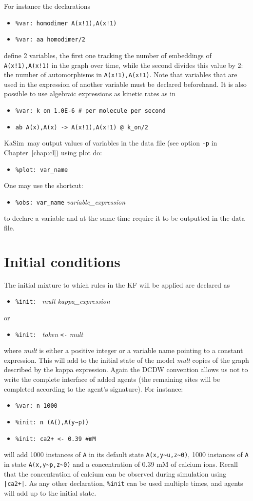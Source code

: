 \documentclass[11pt]{book}
\def\KaSim{\textsf{KaSim}}
\def\int{\hbox{\texttt{\~}}}
\def\ttt#1{\texttt{#1}}
\def\var#1{\textquotesingle #1\textquotesingle}
\def\noi{\noindent}
\def\ITE#1{\begin{itemize}#1\end{itemize}}
\begin{document}

\noi For instance the declarations
\ITE{
\item[] \ttt{\%var: \var{homodimer}~A(x!1),A(x!1)}
\item[] \ttt{\%var: \var{aa}~\var{homodimer}/2}
}
define 2 variables, the first one tracking the number of embeddings of \ttt{A(x!1),A(x!1)} in the graph over time, while the second divides this value by 2: the number of automorphisms in \ttt{A(x!1),A(x!1)}. Note that variables that are used in the expression of another variable must be declared beforehand. 
\vskip 0.25cm
\noi It is also possible to use algebraic expressions as kinetic rates as in
\ITE{
\item[] \ttt{\%var: \var{k\_on}~1.0E-6 \# per molecule per second}
\item[] \ttt{\var{ab}~A(x),A(x) -> A(x!1),A(x!1) @ \var{k\_on}/2}
}
\KaSim~may output values of variables in the data file (see option \ttt{-p} in Chapter~\ref{chap:cl}) using plot do:
\ITE{
\item[] \ttt{\%plot: \textquotesingle var\_name\textquotesingle }
}
One may use the shortcut: 
\ITE{
\item[] \ttt{\%obs: \textquotesingle var\_name\textquotesingle  } \textit{variable\_expression}
}
to declare a variable and at the same time require it to be outputted in the data file. 

\section{Initial conditions}\label{sec:init}

The initial mixture to which rules in the KF will be applied are declared as
\ITE{
\item[] \ttt{\%init: } \textit{mult} \textit{kappa\_expression}
}
or
\ITE{
\item[] \ttt{\%init: }  \textit{token} \ttt{<-} \textit{mult}
}

where \textit{mult} is either a positive integer or a variable name pointing to a constant expression. This will add to the initial state of the model \textit{mult} copies of the graph described by the kappa expression. Again the DCDW convention allows us not to write the complete interface of added agents (the remaining sites will be completed according to the agent's signature). For instance:
\ITE{
\item[] \ttt{\%var: \textquotesingle n\textquotesingle~1000}
\item[] \ttt{\%init: \textquotesingle n\textquotesingle~(A(),A(y\int p))}
\item[] \ttt{\%init: ca2+ <- 0.39 \#mM}
}
will add 1000 instances of \ttt{A} in its default state \ttt{A(x,y\int u,z\int 0)}, 1000 instances of \ttt{A} in state \ttt{A(x,y\int p,z\int 0)} and a concentration of 0.39 mM of calcium ions. Recall that the concentration of calcium can be observed during simulation using \ttt{|ca2+|}.
As any other declaration, \ttt{\%init} can be used multiple times, and agents will add up to the initial state.
\end{document}
